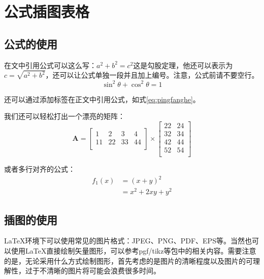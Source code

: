 
\section{公式插图表格}

\subsection{公式的使用}
在文中引用公式可以这么写：$a^2+b^2=c^2$这是勾股定理，他还可以表示为$c=\sqrt{a^2+b^2}$，还可以让公式单独一段并且加上编号。注意，公式前请不要空行。
\begin{equation}
	\sin^2{\theta}+\cos^2{\theta}=1
	\label{eq:pingfanghe}
\end{equation}

还可以通过添加标签在正文中引用公式，如式\eqref{eq:pingfanghe}。

我们还可以轻松打出一个漂亮的矩阵：
\begin{equation}
	\mathbf{A}=
	\left[\begin{matrix}
			1  & 2  & 3  & 4  \\
			11 & 22 & 33 & 44 \\
		\end{matrix}\right] \times
	\left[\begin{matrix}
			22 & 24 \\
			32 & 34 \\
			42 & 44 \\
			52 & 54 \\
		\end{matrix}\right]
\end{equation}

或者多行对齐的公式：
\begin{equation}
	\begin{aligned}
		f_1(x) & =(x+y)^2     \\
		       & =x^2+2xy+y^2
	\end{aligned}
\end{equation}


\subsection{插图的使用}

\LaTeX 环境下可以使用常见的图片格式：JPEG、PNG、PDF、EPS等。当然也可以使用\LaTeX 直接绘制矢量图形，可以参考pgf/tikz等包中的相关内容。需要注意的是，无论采用什么方式绘制图形，首先考虑的是图片的清晰程度以及图片的可理解性，过于不清晰的图片将可能会浪费很多时间。

